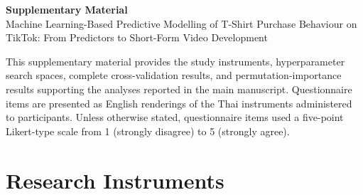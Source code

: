 \documentclass[10pt,a4paper]{article}
\begin{document}
\begin{center}
{\Large\bfseries Supplementary Material}\\[5pt]
{\large Machine Learning-Based Predictive Modelling of T-Shirt Purchase Behaviour on TikTok: From Predictors to Short-Form Video Development}
\end{center}
\vspace{4pt}

\noindent
This supplementary material provides the study instruments, hyperparameter
search spaces, complete cross-validation results, and permutation-importance
results supporting the analyses reported in the main manuscript. Questionnaire
items are presented as English renderings of the Thai instruments administered
to participants. Unless otherwise stated, questionnaire items used a five-point
Likert-type scale from 1 (strongly disagree) to 5 (strongly agree).

\vspace{6pt}

\section*{Research Instruments}
\small
\end{document}

